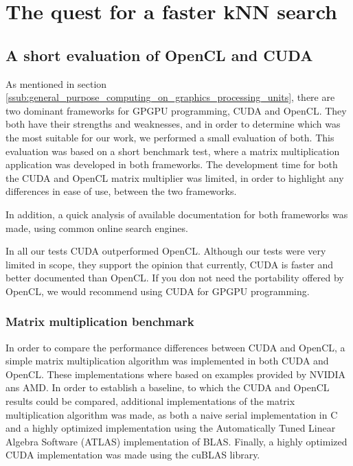 
\chapter{The quest for a faster kNN search} %
\label{sec:the_quest_for_a_faster_knn_search}


\section{A short evaluation of OpenCL and CUDA} %
\label{sub:a_short_evaluation_of_opencl_and_cuda}
As mentioned in section \ref{ssub:general_purpose_computing_on_graphics_processing_units}, there are two dominant frameworks for GPGPU programming, CUDA and OpenCL. They both have their strengths and weaknesses, and in order to determine which was the most suitable for our work, we performed a small evaluation of both. This evaluation was based on a short benchmark test, where a matrix multiplication application was developed in both frameworks. The development time for both the CUDA and OpenCL matrix multiplier was limited, in order to highlight any differences in ease of use, between the two frameworks.

In addition, a quick analysis of available documentation for both frameworks was made, using common online search engines.

In all our tests CUDA outperformed OpenCL. Although our tests were very limited in scope, they support the opinion that currently, CUDA is faster and better documented than OpenCL. If you don not need the portability offered by OpenCL, we would recommend using CUDA for GPGPU programming.

\subsection{Matrix multiplication benchmark} %
\label{sub:matrix_multiplication_benchmark}
In order to compare the performance differences between CUDA and OpenCL, a simple matrix multiplication algorithm was implemented in both CUDA and OpenCL. These implementations where based on examples provided by NVIDIA ans AMD. In order to establish a baseline, to which the CUDA and OpenCL results could be compared, additional implementations of the matrix multiplication algorithm was made, as both a naive serial implementation in C and a highly optimized implementation using the Automatically Tuned Linear Algebra Software (ATLAS\cite{atlas}) implementation of BLAS. Finally, a highly optimized CUDA implementation was made using the cuBLAS\cite{cublas} library.

